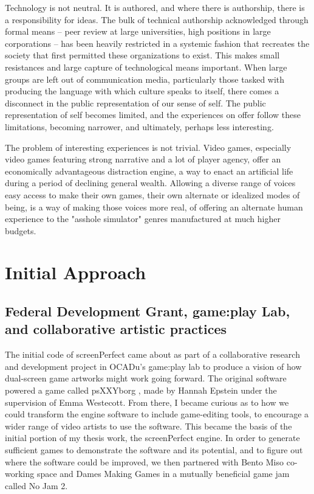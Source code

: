 Technology is not neutral. It is authored, and where there is authorship, there is a responsibility for ideas. The bulk of technical authorship acknowledged through formal means – peer review at large universities, high positions in large corporations – has been heavily restricted in a systemic fashion that recreates the society that first permitted these organizations to exist. This makes small resistances and large capture of technological means important. When large groups are left out of communication media, particularly those tasked with producing the language with which culture speaks to itself, there comes a disconnect in the public representation of our sense of self. The public representation of self becomes limited, and the experiences on offer follow these limitations, becoming narrower, and ultimately, perhaps less interesting.

The problem of interesting experiences is not trivial. Video games, especially video games featuring strong narrative and a lot of player agency, offer an economically advantageous distraction engine, a way to enact an artificial life during a period of declining general wealth. Allowing a diverse range of voices easy access to make their own games, their own alternate or idealized modes of being, is a way of making those voices more real, of offering an alternate human experience to the "asshole simulator" \parencite{bissell} genres manufactured at much higher budgets.
 
\section{Initial Approach}
\subsection{Federal Development Grant, game:play Lab, and collaborative artistic practices}
The initial code of screenPerfect came about as part of a collaborative research and development project in OCADu's game:play lab to produce a vision of how dual-screen game artworks might work going forward. The original software powered a game called psXXYborg \parencite{psxxyborg}, made by Hannah Epstein under the supervision of Emma Westecott. From there, I became curious as to how we could transform the engine software to include game-editing tools, to encourage a wider range of video artists to use the software. This became the basis of the initial portion of my thesis work, the screenPerfect engine. In order to generate sufficient games to demonstrate the software and its potential, and to figure out where the software could be improved, we then partnered with Bento Miso co-working space and Dames Making Games in a mutually beneficial game jam called No Jam 2.

